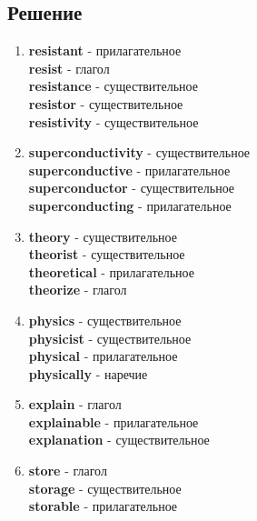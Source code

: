 \subsection*{Решение}
\begin{enumerate}
      \item \textbf{resistant} - прилагательное \\
            \textbf{resist} - глагол \\
            \textbf{resistance} - существительное \\
            \textbf{resistor} - существительное \\
            \textbf{resistivity} - существительное \\

      \item \textbf{superconductivity} - существительное \\
            \textbf{superconductive} - прилагательное \\
            \textbf{superconductor} - существительное \\
            \textbf{superconducting} - прилагательное \\

      \item \textbf{theory} - существительное \\
            \textbf{theorist} - существительное \\
            \textbf{theoretical} - прилагательное \\
            \textbf{theorize} - глагол \\

      \item \textbf{physics} - существительное \\
            \textbf{physicist} - существительное \\
            \textbf{physical} - прилагательное \\
            \textbf{physically} - наречие \\

      \item \textbf{explain} - глагол \\
            \textbf{explainable} - прилагательное \\
            \textbf{explanation} - существительное \\

      \item \textbf{store} - глагол \\
            \textbf{storage} - существительное \\
            \textbf{storable} - прилагательное \\
\end{enumerate}

